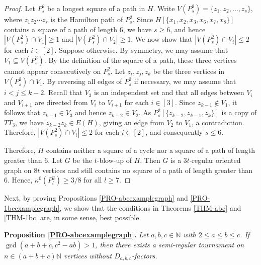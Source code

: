 \documentclass[11pt,a4paper,reqno]{amsart}
\theoremstyle{definition} %
\begin{document}
\begin{proof}
    
    


    Let $P_s^2$ be a longest square of a path in $H$. Write $V(P_s^2)=\{z_1,z_2,\ldots,z_s\}$, where $z_1z_2\cdots z_s$ is the Hamilton path of $P_s^2$. Since $H[\{x_1,x_2,x_3,x_6,x_7,x_8\}]$ contains a square of a path of length $6$, we have $s\geqslant 6$, and hence $|V(P_s^2)\cap V_1|\geqslant 1$ and $|V(P_s^2)\cap V_2|\geqslant 1$. We now show that $|V(P_s^2)\cap V_i|\leqslant 2$ for each $i\in[2]$. Suppose otherwise. By symmetry, we may assume that $V_1\subseteq V(P_s^2)$.  By the definition of the square of a path, these three vertices cannot appear consecutively on $P_s^2$. Let $z_i,z_j,z_k$ be the three vertices in $V(P_s^2)\cap V_1$. By reversing all edges of $P_s^2$ if necessary, we may assume that $i<j\leqslant k-2$. Recall that $V_3$ is an independent set and that all edges between $V_i$ and $V_{i+1}$ are directed from $V_i$ to $V_{i+1}$ for each $i\in[3]$. Since $z_{k-1}\notin V_1$, it follows that $z_{k-1}\in V_3$ and hence $z_{k-2}\in V_2$. As $P_s^2[\{z_{k-2},z_{k-1},z_k\}]$ is a copy of $TT_3$, we have $z_{k-2}z_k\in E(H)$, giving an edge from $V_2$ to $V_1$, a contradiction. Therefore, $|V(P_s^2)\cap V_i|\leqslant 2$ for each $i\in[2]$, and consequently $s\leqslant 6$. 
     
     Therefore, $H$ contains neither a square of a cycle nor a square of a path of length greater than $6$. Let $G$ be the $t$-blow-up of $H$. Then $G$ is a $3t$-regular oriented graph on $8t$ vertices and still contains no square of a path of length greater than $6$. Hence, $\kappa^0(P_l^2)\geqslant 3/8$ for all $l\geqslant 7$.
\end{proof}  


Next, by proving Propositions \ref{PRO-abcexamplegraph} and \ref{PRO-1bcexamplegraph}, we show that the conditions in Theorems \ref{THM-abc} and \ref{THM-1bc} are, in some sense, best possible.


\medskip
\noindent \textbf{Proposition \ref{PRO-abcexamplegraph}.} 
\textit{Let $a,b,c\in\mathbb{N}$ with $2\leqslant a\leqslant b\leqslant c$. If $\gcd(a+b+c,c^2-ab)> 1$, then there exists a semi-regular tournament on $n\in(a+b+c)\mathbb{N}$ vertices  without $D_{a,b,c}$-factors.}
\end{document}
